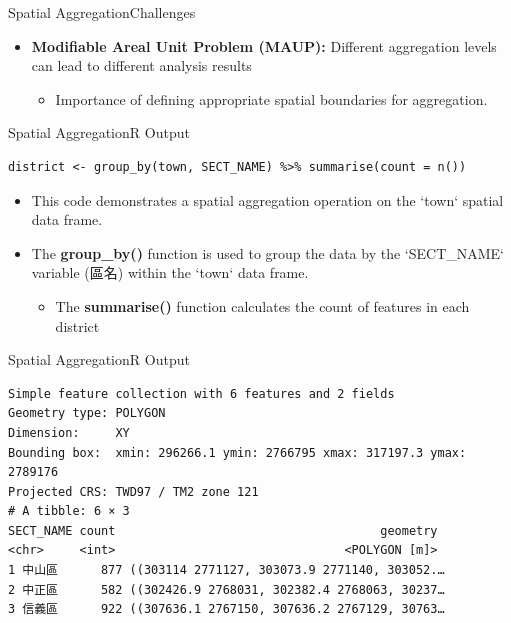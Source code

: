 \documentclass[hyperref={pdfpagelabels=false}]{beamer}
\begin{document}
\begin{frame}{Spatial Aggregation}{Challenges}	
	\begin{itemize}
		\item \textbf{Modifiable Areal Unit Problem (MAUP):} Different aggregation levels can lead to different analysis results
									\vspace{0.2cm}
			\begin{itemize}
		\item Importance of defining appropriate spatial boundaries for aggregation.
			\end{itemize}
	\end{itemize}
\end{frame}










\begin{frame}[fragile]{Spatial Aggregation}{R Output}
\begin{lstlisting}
district <- group_by(town, SECT_NAME) %>% summarise(count = n())
\end{lstlisting}
\begin{itemize}
	\item This code demonstrates a spatial aggregation operation on the `town` spatial data frame.
	\vspace{0.2cm}
	\item The \textbf{group\_by()} function is used to group the data by the `SECT\_NAME` variable (區名) within the `town` data frame.
	
	\begin{itemize}
		\vspace{0.2cm}
		\item The \textbf{summarise()} function calculates the count of features in each district 
	\end{itemize}
	
\end{itemize}
\end{frame}




\begin{frame}[fragile]{Spatial Aggregation}{R Output}
	
	\tiny
	
\begin{lstlisting}
Simple feature collection with 6 features and 2 fields
Geometry type: POLYGON
Dimension:     XY
Bounding box:  xmin: 296266.1 ymin: 2766795 xmax: 317197.3 ymax: 2789176
Projected CRS: TWD97 / TM2 zone 121
# A tibble: 6 × 3
SECT_NAME count                                     geometry
<chr>     <int>                                <POLYGON [m]>
1 中山區      877 ((303114 2771127, 303073.9 2771140, 303052.…
2 中正區      582 ((302426.9 2768031, 302382.4 2768063, 30237…
3 信義區      922 ((307636.1 2767150, 307636.2 2767129, 30763…
\end{lstlisting}
	
\end{frame}
\end{document}
